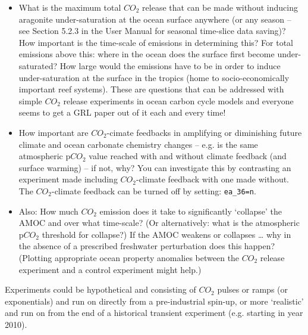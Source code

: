 \documentclass[11pt,fleqn]{book} %
\begin{document}
\begin{itemize}[noitemsep]

\item What is the maximum total \(CO_{2}\) release that can be made without inducing aragonite under-saturation at the ocean surface anywhere (or any season – see Section 5.2.3 in the User Manual for seasonal time-slice data saving)? How important is the time-scale of emissions in determining this? For total emissions above this: where in the ocean does the surface first become under-saturated? How large would the emissions have to be in order to induce under-saturation at the surface in the tropics (home to socio-economically important reef systems). These are questions that can be addressed with simple \(CO_{2}\) release experiments in ocean carbon cycle models and everyone seems to get a GRL paper out of it each and every time!

\item How important are \(CO_{2}\)-cimate feedbacks in amplifying or diminishing future climate and ocean carbonate chemistry changes – e.g. is the same atmospheric p\(CO_{2}\) value reached with and without climate feedback (and surface warming) – if not, why? You can investigate this by contrasting an experiment made including \(CO_{2}\)-climate feedback with one made without. The \(CO_{2}\)-climate feedback can be turned off by setting: \texttt{ea\_36=n}.

\item Also: How much \(CO_{2}\) emission does it take to significantly ‘collapse’ the AMOC and over what time-scale? (Or alternatively: what is the atmospheric p\(CO_{2}\) threshold for collapse?) If the AMOC weakens or collapses … why in the absence of a prescribed freshwater perturbation does this happen? (Plotting appropriate ocean property anomalies between the \(CO_{2}\) release experiment and a control experiment might help.)

\end{itemize}

Experiments could be hypothetical and consisting of \(CO_{2}\) pulses or ramps (or exponentials) and run on directly from a pre-industrial spin-up, or more ‘realistic’ and run on from the end of a historical transient experiment (e.g. starting in year 2010).

\end{document}
